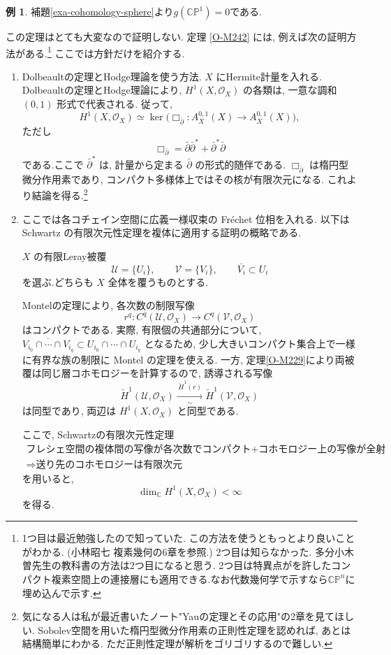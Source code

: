 \documentclass[dvipdfmx,a4paper,11pt]{article} %
\newcommand{\C}{\mathbb{C}}
\theoremstyle{definition}
\numberwithin{equation}{section}
\newtheorem{exa}[thm]{例}
\begin{document}
\begin{exa}\label{O-M245}
補題\ref{exa-cohomology-sphere}より$g(\C\mathbb P^1)=0$である.
\end{exa}

この定理はとても大変なので証明しない. 
定理 \ref{O-M242} には, 例えば次の証明方法がある.\footnote{1つ目は最近勉強したので知っていた. この方法を使うともっとより良いことがわかる. (小林昭七 複素幾何の6章を参照.) 2つ目は知らなかった. 多分小木曽先生の教科書の方法は2つ目になると思う. 2つ目は特異点がを許したコンパクト複素空間上の連接層にも適用できる.なお代数幾何学で示すなら$\C\mathbb P^n$に埋め込んで示す. }
ここでは方針だけを紹介する.

\begin{enumerate}
\item

Dolbeaultの定理とHodge理論を使う方法.
$X$ にHermite計量を入れる.
Dolbeaultの定理とHodge理論により, 
$H^1(X,\mathcal O_X)$ の各類は, 
一意な調和 $(0,1)$ 形式で代表される.
従って, 
\[
H^1(X,\mathcal O_X)
\simeq
\ker\bigl(
\Box_{\bar\partial}:A_X^{0,1}(X)\to A_X^{0,1}(X)
\bigr),
\]
ただし
\[
\Box_{\bar\partial}
=\bar\partial\bar\partial^*
+\bar\partial^*\bar\partial
\]
である.ここで $\bar\partial^*$ は, 
計量から定まる $\bar\partial$ の形式的随伴である.
$\Box_{\bar\partial}$ は楕円型微分作用素であり, 
コンパクト多様体上ではその核が有限次元になる.
これより結論を得る.\footnote{気になる人は私が最近書いたノート"Yauの定理とその応用"の2章を見てほしい. Sobolev空間を用いた楕円型微分作用素の正則性定理を認めれば, あとは結構簡単にわかる. ただ正則性定理が解析をゴリゴリするので難しい. }

\item

ここでは各コチェイン空間に広義一様収束の Fr\'echet 位相を入れる. 以下は Schwartz の有限次元性定理を複体に適用する証明の概略である.

$X$ の有限Leray被覆
\[
\mathcal U=\{U_i\},\qquad
\mathcal V=\{V_i\},\qquad
\overline{V_i}\subset U_i
\]
を選ぶ.どちらも $X$ 全体を覆うものとする.

Montelの定理により, 各次数の制限写像
\[
r^q:C^q(\mathcal U,\mathcal O_X)
\longrightarrow C^q(\mathcal V,\mathcal O_X)
\]
はコンパクトである. 実際, 有限個の共通部分について,
$\overline{V_{i_0}\cap\cdots\cap V_{i_q}}\subset U_{i_0}\cap\cdots\cap U_{i_q}$
となるため, 少し大きいコンパクト集合上で一様に有界な族の制限に Montel の定理を使える.
一方, 定理\ref{O-M229}により両被覆は同じ層コホモロジーを計算するので, 
誘導される写像
\[
\check H^1(\mathcal U,\mathcal O_X)
\xrightarrow[\sim]{\,\check H^1(r)\,}
\check H^1(\mathcal V,\mathcal O_X)
\]
は同型であり, 両辺は $H^1(X,\mathcal O_X)$ と同型である.

ここで, Schwartzの有限次元性定理
\[
\begin{gathered}
\text{フレシェ空間の複体間の写像が各次数でコンパクト}
+
\text{コホモロジー上の写像が全射}
\\[2pt]
\Longrightarrow
\text{送り先のコホモロジーは有限次元}
\end{gathered}
\]
を用いると, 
\[
\dim_{\C}H^1(X,\mathcal O_X)<\infty
\]
を得る.
\end{enumerate}
\end{document}
